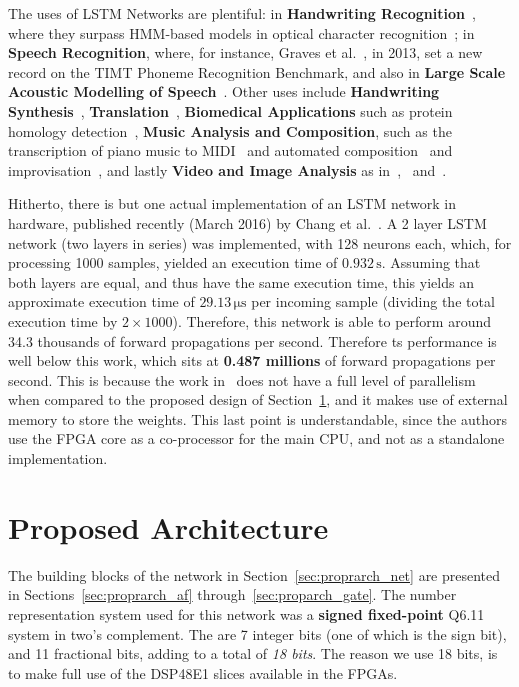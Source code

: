 \documentclass{IEEEtran}
\begin{document}
The uses of LSTM Networks are plentiful: in \textbf{Handwriting Recognition}~\cite{ICDAR09}, where they surpass
HMM-based models in optical character recognition~\cite{Breuel13}; in \textbf{Speech Recognition}, where, for
instance, Graves et al.~\cite{Graves13}, in 2013, set a new record on the TIMT Phoneme Recognition Benchmark,
and also in \textbf{Large Scale Acoustic Modelling of Speech}~\cite{Sak14}. Other uses include
\textbf{Handwriting Synthesis}~\cite{Graves13_2}, \textbf{Translation}~\cite{Sustkever14}, \textbf{Biomedical Applications} such
as protein homology detection~\cite{Hochreiter07}, \textbf{Music Analysis and Composition}, such as the transcription of piano music
to MIDI~\cite{Bock12} and automated composition~\cite{Coca13} and improvisation~\cite{Eck02}, and lastly \textbf{Video and Image Analysis} as
in~\cite{Vinyals14},~\cite{Donahue14} and~\cite{Donahue14_2}.

Hitherto, there is but one actual implementation of an LSTM network in hardware, published recently
(March 2016) by Chang et al.~\cite{Chang15}. A 2 layer LSTM network (two layers in series) was implemented,
with 128 neurons each, which, for processing 1000 samples, yielded an execution time of $0.932 \, \si{\second}$. Assuming
that both layers are equal, and thus have the same execution time, this yields an approximate execution time of
$29.13 \, \si{\micro\second}$ per incoming sample (dividing the total execution time by $2 \times 1000$).
Therefore, this network is able to perform around 34.3 thousands of forward propagations per second.
Therefore ts performance is well below this work, which sits at \textbf{0.487 millions} of forward propagations per second.
This is because the work in~\cite{Chang15} does not have a full level of parallelism when compared to the proposed design of
Section~\ref{sec:proparch}, and it makes use of external memory to store the weights. This last point is understandable,
since the authors use the FPGA core as a co-processor for the main CPU, and not as a standalone implementation.

\section{Proposed Architecture}\label{sec:proparch}

The building blocks of the network in Section~\ref{sec:proprarch_net} are presented in Sections~\ref{sec:proprarch_af} through~\ref{sec:proparch_gate}.
The number representation system used for this network was a \textbf{signed fixed-point} Q6.11 system in two's complement. The are 7 integer bits (one of which is
the sign bit), and 11 fractional bits, adding to a total of \textit{18 bits}. The reason we use 18 bits, is to make full use of the DSP48E1 slices available
in the FPGAs.
\end{document}
